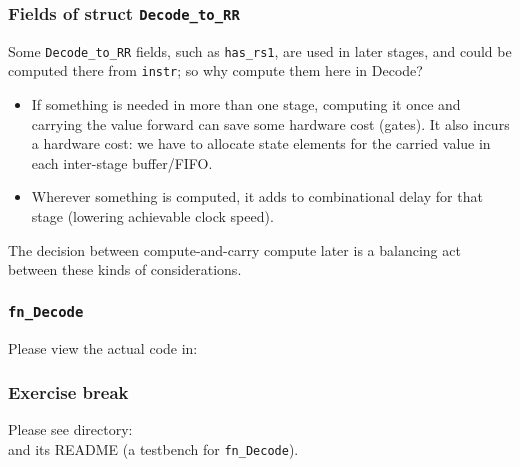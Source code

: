 
\begin{frame}[fragile]
\frametitle{Fields of struct {\tt Decode\_to\_RR}}

\footnotesize

Some {\tt Decode\_to\_RR} fields, such as \verb|has_rs1|, are used in
later stages, and could be computed there from \verb|instr|; so why
compute them here in Decode?

\vspace{4ex}

\begin{itemize}

 \item If something is needed in more than one stage, computing it
       once and carrying the value forward can save some hardware cost
       (gates).  It also incurs a hardware cost: we have to allocate
       state elements for the carried value in each inter-stage
       buffer/FIFO.

 \item Wherever something is computed, it adds to combinational delay
       for that stage (lowering achievable clock speed).

\end{itemize}

\vspace{4ex}

The decision between compute-and-carry {\vs} compute later is a
balancing act between these kinds of considerations.

\end{frame}


\begin{frame}
\frametitle{{\tt fn\_Decode}}

\footnotesize

\begin{center}\large
 Please view the actual code in: 
\end{center}

\end{frame}


\begin{frame}
\frametitle{\EmojiExercise \hmm Exercise break}

Please see directory:  \\
and its README (a testbench for {\tt fn\_Decode}).

\end{frame}

